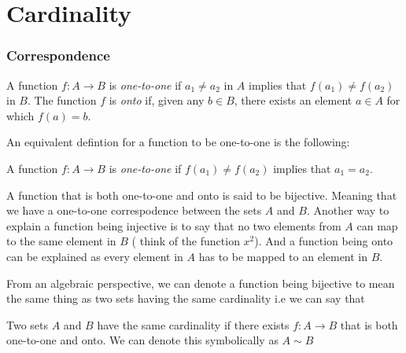 


\chapter{Cardinality}

\subsection{Correspondence}

\begin{tcolorbox}
\begin{defn}
    A function \( f: A \to B \) is \textit{one-to-one} if \( a_1 \neq a_2 \) in \( A \) implies that 
    \( f(a_1) \neq f(a_2) \) in \( B \). The function \( f \) is \textit{onto} if, given any \( b \in B \), there exists an element \( a \in A \) for which \( f(a) = b\).
\end{defn}
\end{tcolorbox}

An equivalent defintion for a function to be one-to-one is the following:

\begin{tcolorbox}
\begin{defn}
    A function \( f: A \to B \) is \textit{one-to-one} if \( f(a_1) \neq f(a_2) \) implies that \( a_1 = a_2 \).
\end{defn}
\end{tcolorbox}
    
A function that is both one-to-one and onto is said to be bijective. Meaning that we have a one-to-one correspodence between the sets \( A \) and \( B \). Another way to explain a function being injective is to say that no two elements from \( A \) can map to the same element in \( B \) ( think of the function \( x^2\)). And a function being onto can be explained as every element in \( A \) has to be mapped to an element in \( B \).

From an algebraic perspective, we can denote a function being bijective to mean the same thing as two sets having the same cardinality i.e we can say that 

\begin{tcolorbox}
\begin{defn}
Two sets \( A \) and \( B \) have the same cardinality if there exists \( f: A \to B \) that is both one-to-one and onto. We can denote this symbolically as \( A \sim B\)
\end{defn}
\end{tcolorbox}

